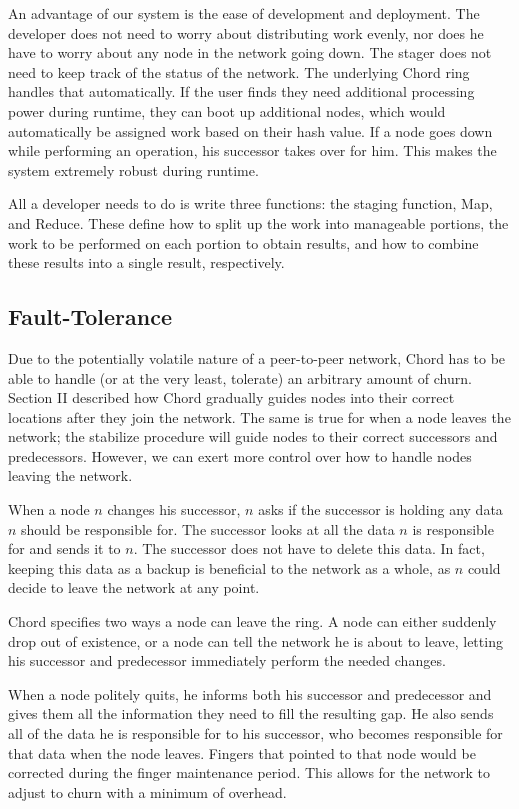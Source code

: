 \documentclass[10pt, conference, compsocconf]{IEEEtran}
\begin{document}
An advantage of our system is the ease of development and deployment.  The developer does not need to worry about distributing work evenly, nor does he have to worry about any node in the network going down.  The stager does not need to keep track of the status of the network.  The underlying Chord ring handles that automatically.  If the user finds they need additional processing power during runtime, they can boot up additional nodes, which would automatically be assigned work based on their hash value.   If a node goes down while performing an operation, his successor takes over for him.  This makes the system extremely robust during runtime.

All a developer needs to do is write three functions: the staging function, Map, and Reduce.  These define how to split up the work into manageable portions, the work to be performed on each portion to obtain results, and how to combine these results into a single result, respectively. 



\subsection{Fault-Tolerance}

Due to the potentially volatile nature of a peer-to-peer network, Chord has to be able to handle (or at the very least, tolerate) an arbitrary amount of churn.  Section II described how Chord gradually guides nodes into their correct locations after they join the network.  The same is true for when a node leaves the network; the stabilize procedure will guide nodes to their correct successors and predecessors.  However, we can exert more control over how to handle nodes leaving the network.

When a node $n$ changes his successor, $n$ asks if the successor is holding any data $n$ should be responsible for.  The successor looks at all the data $n$ is responsible for and sends it to $n$.  The successor does not have to delete this data. In fact, keeping this data as a backup is beneficial to the network as a whole, as $n$ could decide to leave the network at any point. 

Chord specifies two ways a node can leave the ring.  A node can either suddenly drop out of existence, or a node can tell the network he is about to leave, letting his successor and predecessor immediately perform the needed changes.

When a node politely quits, he informs both his successor and predecessor and gives them all the information they need to fill the resulting gap. He also sends all of the data he is responsible for to his successor, who becomes responsible for that data when the node leaves.  Fingers that pointed to that node would be corrected during the finger maintenance period.  This allows for the network to adjust to churn with a minimum of overhead.
\end{document}
